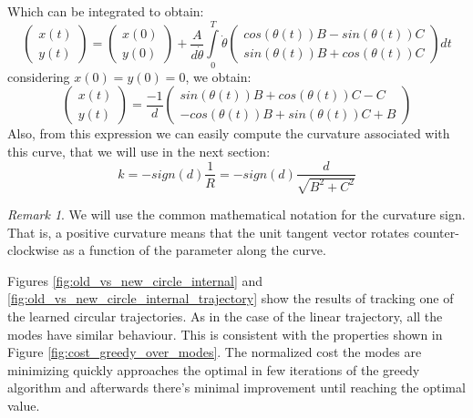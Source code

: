 \documentclass[12,twoside]{TFG-GM}
\theoremstyle{definition}
\theoremstyle{remark}
\newtheorem{remark}[theorem]{Remark}
\begin{document}
Which can be integrated to obtain:
$$
\begin{pmatrix} x(t)\\ y(t) \end{pmatrix} =\begin{pmatrix} x(0)\\ y(0) \end{pmatrix} + \dfrac{A}{d \dot{\theta}} \int\limits_0^T \dot{\theta}\begin{pmatrix}
cos(\theta(t))B - sin(\theta(t))C\\ sin(\theta(t))B + cos(\theta(t))C
\end{pmatrix} dt$$ considering $x(0) = y(0) = 0$, we obtain:
\begin{equation} \label{eq:circular_trajectory}
\begin{pmatrix} x(t)\\ y(t) \end{pmatrix} = \dfrac{-1}{d} \begin{pmatrix}
sin(\theta(t))B + cos(\theta(t))C - C\\ -cos(\theta(t))B + sin(\theta(t))C + B
\end{pmatrix}
\end{equation}
Also, from this expression we can easily compute the curvature associated with this curve, that we will use in the next section:
\begin{equation} \label{eq:curvature}
k = -sign(d) \dfrac{1}{R} = -sign(d) \dfrac{d}{\sqrt{B^2 + C^2}}
\end{equation}

\begin{remark}
We will use the common mathematical notation for the curvature sign. That is, a positive curvature means that the unit tangent vector rotates counter-clockwise as a function of the parameter along the curve.
\end{remark}

Figures \ref{fig:old_vs_new_circle_internal} and \ref{fig:old_vs_new_circle_internal_trajectory} show the results of tracking one of the learned circular trajectories. As in the case of the linear trajectory, all the modes have similar behaviour. This is consistent with the properties shown in Figure \ref{fig:cost_greedy_over_modes}. The normalized cost the modes are minimizing quickly approaches the optimal in few iterations of the greedy algorithm and afterwards there's minimal improvement until reaching the optimal value.
\end{document}
